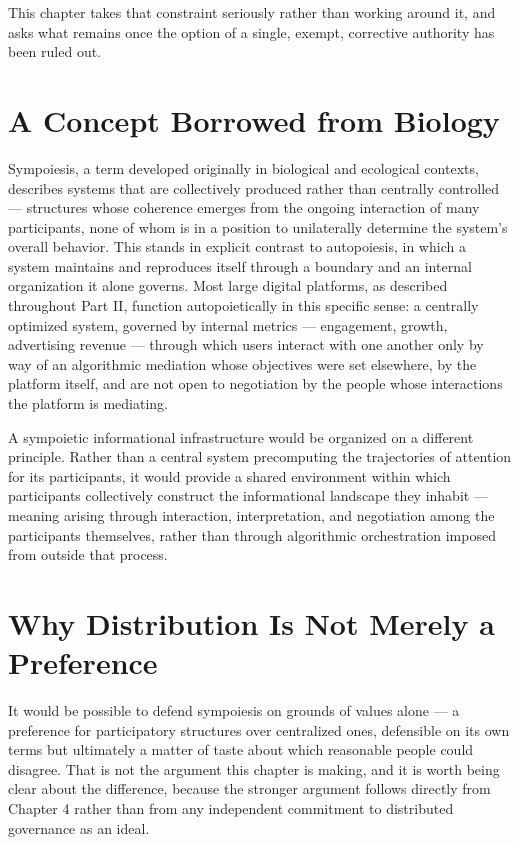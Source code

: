 \documentclass[12pt,a4paper]{book}
\begin{document}
This chapter takes that constraint seriously rather than working around it, and asks what remains once the option of a single, exempt, corrective authority has been ruled out.

\section{A Concept Borrowed from Biology}

Sympoiesis, a term developed originally in biological and ecological contexts, describes systems that are collectively produced rather than centrally controlled — structures whose coherence emerges from the ongoing interaction of many participants, none of whom is in a position to unilaterally determine the system's overall behavior. This stands in explicit contrast to autopoiesis, in which a system maintains and reproduces itself through a boundary and an internal organization it alone governs. Most large digital platforms, as described throughout Part II, function autopoietically in this specific sense: a centrally optimized system, governed by internal metrics — engagement, growth, advertising revenue — through which users interact with one another only by way of an algorithmic mediation whose objectives were set elsewhere, by the platform itself, and are not open to negotiation by the people whose interactions the platform is mediating.

A sympoietic informational infrastructure would be organized on a different principle. Rather than a central system precomputing the trajectories of attention for its participants, it would provide a shared environment within which participants collectively construct the informational landscape they inhabit — meaning arising through interaction, interpretation, and negotiation among the participants themselves, rather than through algorithmic orchestration imposed from outside that process.

\section{Why Distribution Is Not Merely a Preference}

It would be possible to defend sympoiesis on grounds of values alone — a preference for participatory structures over centralized ones, defensible on its own terms but ultimately a matter of taste about which reasonable people could disagree. That is not the argument this chapter is making, and it is worth being clear about the difference, because the stronger argument follows directly from Chapter 4 rather than from any independent commitment to distributed governance as an ideal.
\end{document}
